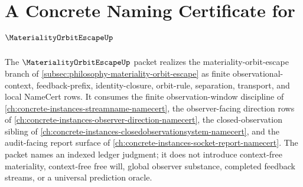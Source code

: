 \chapter{A Concrete Naming Certificate for $\MaterialityOrbitEscapeUp$}
\label{ch:concrete-instances-materiality-orbit-escape-namecert}

The $\MaterialityOrbitEscapeUp$ packet realizes the materiality-orbit-escape branch of \autoref{subsec:philosophy-materiality-orbit-escape} as finite observational-context, feedback-prefix, identity-closure, orbit-rule, separation, transport, and local NameCert rows. It consumes the finite observation-window discipline of \autoref{ch:concrete-instances-streamname-namecert}, the observer-facing direction rows of \autoref{ch:concrete-instances-observer-direction-namecert}, the closed-observation sibling of \autoref{ch:concrete-instances-closedobservationsystem-namecert}, and the audit-facing report surface of \autoref{ch:concrete-instances-socket-report-namecert}. The packet names an indexed ledger judgment; it does not introduce context-free materiality, context-free free will, global observer substance, completed feedback streams, or a universal prediction oracle.

